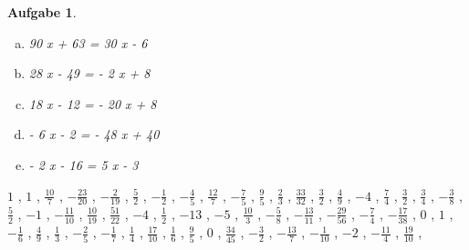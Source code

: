 \documentclass[12pt,fleqn]{article}
\theoremstyle{aufg}
\newtheorem{aufgabe}{Aufgabe}
\theoremstyle{bsp}
\begin{document}
\begin{flushleft}
\begin{aufgabe}
\begin{multicols}{3}
\begin{enumerate}[a)]
30 x - 18 = 6 x - 14
\item 
90 x + 63 = 30 x - 6
\item 
28 x - 49 = - 2 x + 8
\item 
18 x - 12 = - 20 x + 8
\item 
- 6 x - 2 = - 48 x + 40
\item 
- 2 x - 16 = 5 x - 3
\end{enumerate} 
\end{multicols} 
\end{aufgabe} 
$ \scriptstyle1$ , $ \scriptstyle1$ , $ \scriptstyle\frac{10}{7}$ , $ \scriptstyle- \frac{23}{20}$ , $ \scriptstyle- \frac{2}{19}$ , $ \scriptstyle\frac{5}{2}$ , $ \scriptstyle- \frac{1}{2}$ , $ \scriptstyle- \frac{4}{5}$ , $ \scriptstyle\frac{12}{7}$ , $ \scriptstyle- \frac{7}{5}$ , $ \scriptstyle\frac{9}{5}$ , $ \scriptstyle\frac{2}{3}$ , $ \scriptstyle\frac{33}{32}$ , $ \scriptstyle\frac{3}{2}$ , $ \scriptstyle\frac{4}{9}$ , $ \scriptstyle-4$ , $ \scriptstyle\frac{7}{4}$ , $ \scriptstyle\frac{3}{2}$ , $ \scriptstyle\frac{3}{4}$ , $ \scriptstyle- \frac{3}{8}$ , $ \scriptstyle\frac{5}{2}$ , $ \scriptstyle-1$ , $ \scriptstyle- \frac{11}{10}$ , $ \scriptstyle\frac{10}{19}$ , $ \scriptstyle\frac{51}{22}$ , $ \scriptstyle-4$ , $ \scriptstyle\frac{1}{2}$ , $ \scriptstyle-13$ , $ \scriptstyle-5$ , $ \scriptstyle\frac{10}{3}$ , $ \scriptstyle- \frac{5}{8}$ , $ \scriptstyle- \frac{13}{11}$ , $ \scriptstyle- \frac{29}{56}$ , $ \scriptstyle- \frac{7}{4}$ , $ \scriptstyle- \frac{17}{38}$ , $ \scriptstyle0$ , $ \scriptstyle1$ , $ \scriptstyle- \frac{1}{6}$ , $ \scriptstyle\frac{4}{9}$ , $ \scriptstyle\frac{1}{3}$ , $ \scriptstyle- \frac{2}{5}$ , $ \scriptstyle- \frac{1}{7}$ , $ \scriptstyle\frac{1}{4}$ , $ \scriptstyle\frac{17}{10}$ , $ \scriptstyle\frac{1}{6}$ , $ \scriptstyle\frac{9}{5}$ , $ \scriptstyle0$ , $ \scriptstyle\frac{34}{45}$ , $ \scriptstyle- \frac{3}{2}$ , $ \scriptstyle- \frac{13}{7}$ , $ \scriptstyle- \frac{1}{10}$ , $ \scriptstyle-2$ , $ \scriptstyle- \frac{11}{4}$ , $ \scriptstyle\frac{19}{10}$ , \\[0.2em] 

\end{flushleft}
\end{document}

